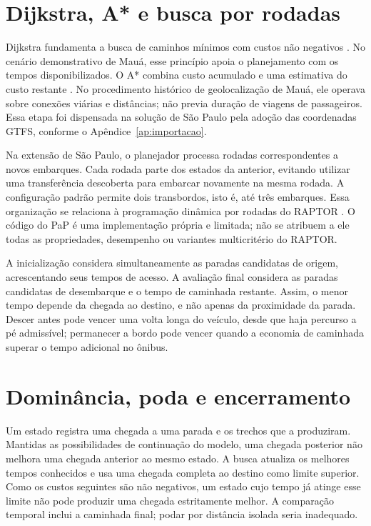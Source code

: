 \documentclass[12pt,oneside,a4paper,brazil,chapter=TITLE]{abntex2}
\let\papsection\section
\renewcommand{\section}{\clearpage\papsection}
\begin{document}
\begin{apendicesenv}
\section{Dijkstra, A* e busca por rodadas}
Dijkstra fundamenta a busca de caminhos mínimos com custos não negativos \citep{dijkstra1959}. No cenário demonstrativo de Mauá, esse princípio apoia o planejamento com os tempos disponibilizados. O A* combina custo acumulado e uma estimativa do custo restante \citep{hart1968}. No procedimento histórico de geolocalização de Mauá, ele operava sobre conexões viárias e distâncias; não previa duração de viagens de passageiros. Essa etapa foi dispensada na solução de São Paulo pela adoção das coordenadas GTFS, conforme o Apêndice~\ref{ap:importacao}.

Na extensão de São Paulo, o planejador processa rodadas correspondentes a novos embarques. Cada rodada parte dos estados da anterior, evitando utilizar uma transferência descoberta para embarcar novamente na mesma rodada. A configuração padrão permite dois transbordos, isto é, até três embarques. Essa organização se relaciona à programação dinâmica por rodadas do RAPTOR \citep{delling2012}. O código do PaP é uma implementação própria e limitada; não se atribuem a ele todas as propriedades, desempenho ou variantes multicritério do RAPTOR.

A inicialização considera simultaneamente as paradas candidatas de origem, acrescentando seus tempos de acesso. A avaliação final considera as paradas candidatas de desembarque e o tempo de caminhada restante. Assim, o menor tempo depende da chegada ao destino, e não apenas da proximidade da parada. Descer antes pode vencer uma volta longa do veículo, desde que haja percurso a pé admissível; permanecer a bordo pode vencer quando a economia de caminhada superar o tempo adicional no ônibus.

\section{Dominância, poda e encerramento}
Um estado registra uma chegada a uma parada e os trechos que a produziram. Mantidas as possibilidades de continuação do modelo, uma chegada posterior não melhora uma chegada anterior ao mesmo estado. A busca atualiza os melhores tempos conhecidos e usa uma chegada completa ao destino como limite superior. Como os custos seguintes são não negativos, um estado cujo tempo já atinge esse limite não pode produzir uma chegada estritamente melhor. A comparação temporal inclui a caminhada final; podar por distância isolada seria inadequado.


\end{apendicesenv}
\end{document}
